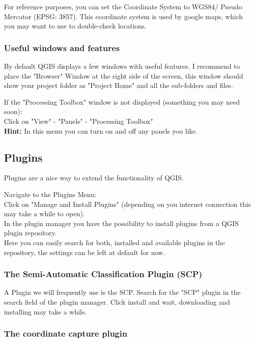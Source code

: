 \documentclass[12pt,a4paper]{scrartcl}
\begin{document}
For reference purposes, you can set the Coordinate System to WGS84/ Pseudo Mercator (EPSG: 3857).  
This coordinate system is used by google maps, which you may want to use to double-check locations.

\subsubsection{Useful windows and features}

By default QGIS displays a few windows with useful features.
I recommend to place the "Browser" Window at the right side of the screen, this window should show your project 
folder as "Project Home"  and all the sub-folders and files.

If the "Processing Toolbox" window is not displayed (something you may need soon): \\
Click on "View" - "Panels" - "Processing Toolbox" \\

\textbf{Hint:} In this menu you can turn on and off any panels you like.

\subsection{Plugins}

Plugins are a nice way to extend the functionality of QGIS.

Navigate to the Plugins Menu: \\
Click on "Manage and Install Plugins" (depending on you internet connection this may take a while to open). \\
In the plugin manager you have the possibility to install plugins from a QGIS plugin repository. \\
Here you can easily search for both, installed and available plugins in the repository, the settings can be left at default for now.

\subsubsection{The Semi-Automatic Classification Plugin (SCP)}

A Plugin we will frequently use is the SCP. Search for the "SCP" plugin in the search field of the plugin manager.
Click install and wait, downloading and installing may take a while.

\subsubsection{The coordinate capture plugin}
\label{coordcap}
\end{document}
